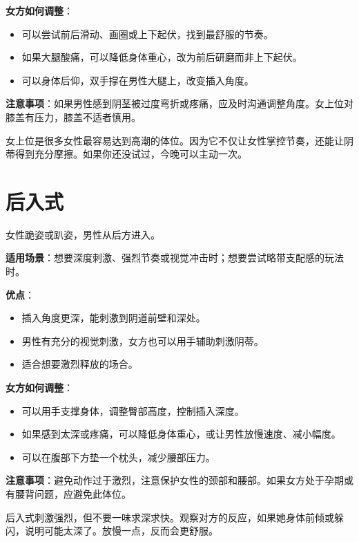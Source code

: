 \documentclass[12pt,UTF8]{ctexbook}
\begin{document}
\textbf{女方如何调整}：
\begin{itemize}
\item 可以尝试前后滑动、画圈或上下起伏，找到最舒服的节奏。
\item 如果大腿酸痛，可以降低身体重心，改为前后研磨而非上下起伏。
\item 可以身体后仰，双手撑在男性大腿上，改变插入角度。
\end{itemize}

\textbf{注意事项}：如果男性感到阴茎被过度弯折或疼痛，应及时沟通调整角度。女上位对膝盖有压力，膝盖不适者慎用。

\begin{tcolorbox}[colback=pink!5!white,colframe=red!50!black,title=贴心小叮咛]
女上位是很多女性最容易达到高潮的体位。因为它不仅让女性掌控节奏，还能让阴蒂得到充分摩擦。如果你还没试过，今晚可以主动一次。
\end{tcolorbox}

\section{后入式}

女性跪姿或趴姿，男性从后方进入。

\textbf{适用场景}：想要深度刺激、强烈节奏或视觉冲击时；想要尝试略带支配感的玩法时。

\textbf{优点}：
\begin{itemize}
\item 插入角度更深，能刺激到阴道前壁和深处。
\item 男性有充分的视觉刺激，女方也可以用手辅助刺激阴蒂。
\item 适合想要激烈释放的场合。
\end{itemize}

\textbf{女方如何调整}：
\begin{itemize}
\item 可以用手支撑身体，调整臀部高度，控制插入深度。
\item 如果感到太深或疼痛，可以降低身体重心，或让男性放慢速度、减小幅度。
\item 可以在腹部下方垫一个枕头，减少腰部压力。
\end{itemize}

\textbf{注意事项}：避免动作过于激烈，注意保护女性的颈部和腰部。如果女方处于孕期或有腰背问题，应避免此体位。

\begin{tcolorbox}[colback=pink!5!white,colframe=red!50!black,title=贴心小叮咛]
后入式刺激强烈，但不要一味求深求快。观察对方的反应，如果她身体前倾或躲闪，说明可能太深了。放慢一点，反而会更舒服。
\end{tcolorbox}
\end{document}
